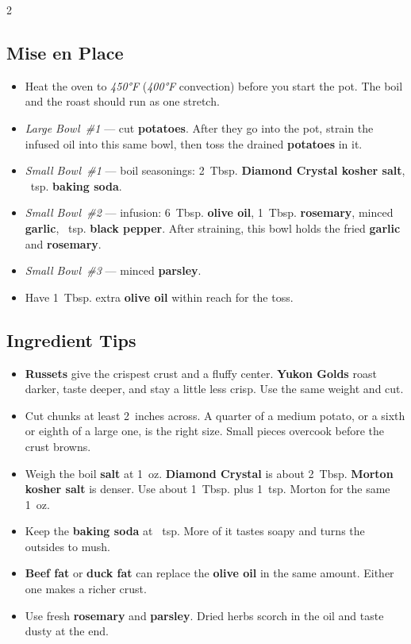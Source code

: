 \documentclass[11pt,letterpaper]{article}
\begin{document}
{\begin{multicols}{2}
\subsection*{Mise en Place}
\begin{itemize}
    \item Heat the oven to \textit{450°F} (\textit{400°F} convection) before you start the pot. The boil and the roast should run as one stretch.
    \item \textit{Large Bowl~\#1} --- cut \textbf{potatoes}. After they go into the pot, strain the infused oil into this same bowl, then toss the drained \textbf{potatoes} in it.
    \item \textit{Small Bowl~\#1} --- boil seasonings: 2~Tbsp. \textbf{Diamond Crystal kosher salt}, ~tsp. \textbf{baking soda}.
    \item \textit{Small Bowl~\#2} --- infusion: 6~Tbsp. \textbf{olive oil}, 1~Tbsp. \textbf{rosemary}, minced \textbf{garlic}, ~tsp. \textbf{black pepper}. After straining, this bowl holds the fried \textbf{garlic} and \textbf{rosemary}.
    \item \textit{Small Bowl~\#3} --- minced \textbf{parsley}.
    \item Have 1~Tbsp. extra \textbf{olive oil} within reach for the toss.
\end{itemize}

\subsection*{Ingredient Tips}
\begin{itemize}
    \item \textbf{Russets} give the crispest crust and a fluffy center. \textbf{Yukon Golds} roast darker, taste deeper, and stay a little less crisp. Use the same weight and cut.
    \item Cut chunks at least 2~inches across. A quarter of a medium potato, or a sixth or eighth of a large one, is the right size. Small pieces overcook before the crust browns.
    \item Weigh the boil \textbf{salt} at 1~oz. \textbf{Diamond Crystal} is about 2~Tbsp. \textbf{Morton kosher salt} is denser. Use about 1~Tbsp. plus 1~tsp. Morton for the same 1~oz.
    \item Keep the \textbf{baking soda} at ~tsp. More of it tastes soapy and turns the outsides to mush.
    \item \textbf{Beef fat} or \textbf{duck fat} can replace the \textbf{olive oil} in the same amount. Either one makes a richer crust.
    \item Use fresh \textbf{rosemary} and \textbf{parsley}. Dried herbs scorch in the oil and taste dusty at the end.
\end{itemize}


\end{multicols}}
\end{document}
